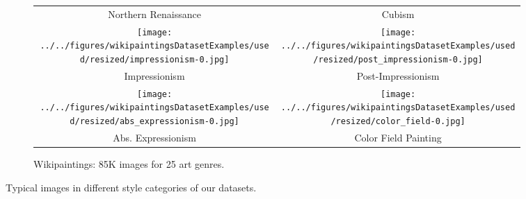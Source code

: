 \begin{figure}[t]
{\begin{subfigure}[t]{0.48\linewidth}
\begin{tabular}{cc}
    Northern Renaissance & Cubism \\
    \texttt{[image: ../../figures/wikipaintingsDatasetExamples/used/resized/impressionism-0.jpg]} &
    \texttt{[image: ../../figures/wikipaintingsDatasetExamples/used/resized/post\_impressionism-0.jpg]} \\
    Impressionism & Post-Impressionism \\
    \texttt{[image: ../../figures/wikipaintingsDatasetExamples/used/resized/abs\_expressionism-0.jpg]} &
    \texttt{[image: ../../figures/wikipaintingsDatasetExamples/used/resized/color\_field-0.jpg]} \\
    Abs. Expressionism & Color Field Painting \\
    \end{tabular}
    \caption{
        Wikipaintings: 85K images for 25 art genres.
    }\label{fig:wikipaintings_style_examples}
\end{subfigure}
}
\caption{
    Typical images in different style categories of our datasets.
}\label{fig:style_examples}
\end{figure}
